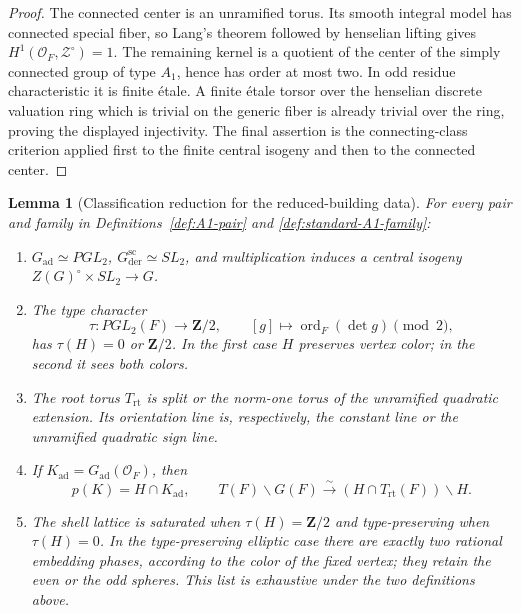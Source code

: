 \documentclass[11pt]{article}
\newtheorem{lemma}[theorem]{Lemma}
\theoremstyle{definition}
\theoremstyle{remark}
\newcommand{\ord}{\operatorname{ord}}
\newcommand{\rt}{\mathrm{rt}}
\newcommand{\ad}{\mathrm{ad}}
\newcommand{\der}{\mathrm{der}}
\newcommand{\cO}{\mathcal O}
\begin{document}
\begin{proof}
The connected center is an unramified torus.  Its smooth integral model has
connected special fiber, so Lang's theorem followed by henselian lifting
gives $H^1(\cO_F,\mathcal Z^\circ)=1$.  The remaining kernel is a quotient of
the center of the simply connected group of type $A_1$, hence has order at
most two.  In odd residue characteristic it is finite \'etale.  A finite
\'etale torsor over the henselian discrete valuation ring which is trivial on
the generic fiber is already trivial over the ring, proving the displayed
injectivity.  The final assertion is the connecting-class criterion applied
first to the finite central isogeny and then to the connected center.
\end{proof}

\begin{lemma}[Classification reduction for the reduced-building data]
\label{lem:A1-building-classification}
For every pair and family in Definitions~\ref{def:A1-pair} and
\ref{def:standard-A1-family}:
\begin{enumerate}[label=\textup{(\alph*)}]
\item $G_{\ad}\simeq PGL_2$, $G_{\der}^{\mathrm{sc}}\simeq SL_2$, and
  multiplication induces a central isogeny
  $Z(G)^\circ\times SL_2\to G$.
\item The type character
  \begin{equation}
   \tau:PGL_2(F)\longrightarrow\mathbf Z/2,
   \qquad[g]\longmapsto\ord_F(\det g)\pmod2,
   \label{eq:A1-type-character}
  \end{equation}
  has $\tau(H)=0$ or $\mathbf Z/2$.  In the first case $H$ preserves vertex
  color; in the second it sees both colors.
\item The root torus $T_{\rt}$ is split or the norm-one torus of the
  unramified quadratic extension.  Its orientation line is, respectively,
  the constant line or the unramified quadratic sign line.
\item If $K_{\ad}=G_{\ad}(\cO_F)$, then
  \begin{equation}
   p(K)=H\cap K_{\ad},
   \qquad
   T(F)\backslash G(F)\xrightarrow{\sim}
   (H\cap T_{\rt}(F))\backslash H.
   \label{eq:A1-adjoint-quotient}
  \end{equation}
\item The shell lattice is saturated when $\tau(H)=\mathbf Z/2$ and
  type-preserving when $\tau(H)=0$.  In the type-preserving elliptic case
  there are exactly two rational embedding phases, according to the color of
  the fixed vertex; they retain the even or the odd spheres.  This list is
  exhaustive under the two definitions above.
\end{enumerate}
\end{lemma}
\end{document}
